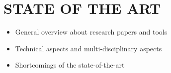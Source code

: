 \chapter{STATE OF THE ART}
\label{chapter:state-of-the-art}
\begin{itemize}
\item General overview about research papers and tools
\item Technical aspects and multi-disciplinary aspects
\item Shortcomings of the state-of-the-art
\end{itemize}
